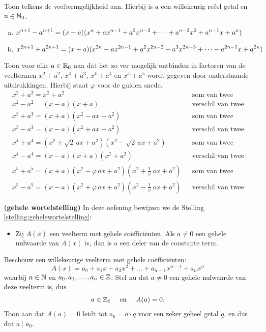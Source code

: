 \documentclass{ximera}
\begin{document}
\begin{Uitbreiding}
\begin{exercise} 
Toon telkens de veeltermgelijkheid aan. Hierbij is $a$ een willekeurig re\"eel getal en $n \in \mathbb{N}_0$.
\begin{enumerate}[(a)]
\item
$\displaystyle x^{n+1} - a^{n+1} = (x-a)(x^{n} + ax^{n-1} + a^2x^{n-2} + \dots + a^{n-2}x^2 + a^{n-1}x + a^{n})$
\item
$\displaystyle x^{2n+1} + a^{2n+1} = (x+a)(x^{2n} - ax^{2n-1} + a^2x^{2n-2} - a^3x^{2n-3} + \dots - a^{2n-1}x + a^{2n})$
\end{enumerate}
\end{exercise} 

\begin{exercise} 
\label{somtweevierdemachten}
Toon voor elke $a \in \mathbb{R}_0$ aan dat het zo ver mogelijk ontbinden in factoren van de veeltermen $x^2 \pm a^2$, $x^3 \pm a^3$, $x^4 \pm a^4$ en  $x^5 \pm a^5$ wordt gegeven door onderstaande uitdrukkingen. Hierbij staat $\varphi$ voor de gulden snede. %
\begin{align*}
& x^2 + a^2 = x^2 + a^2 && \text{som van twee kwadraten} \\
& x^2 - a^2 = (x-a)(x+a) && \text{verschil van twee kwadraten} \\
& x^3 + a^3 = (x+a)(x^2 - ax + a^2) && \text{som van twee derde machten} \\
& x^3 - a^3 = (x-a)(x^2 + ax + a^2) && \text{verschil van twee derde machten} \\
& x^4 + a^4 = (x^2 + \sqrt{2}\,ax + a^2)(x^2 - \sqrt{2}\,ax + a^2) && \text{som van twee vierde machten} \\
& x^4 - a^4 = (x-a)(x+a)(x^2+a^2) && \text{verschil van twee vierde machten} \\
& x^5 + a^5 = (x+a)(x^2-\varphi\,ax + a^2)(x^2+\frac{1}{\varphi}\,ax + a^2) && \text{som van twee vijfde machten} \\
& x^5 - a^5 = (x-a)(x^2+\varphi\,ax + a^2)(x^2-\frac{1}{\varphi}\,ax + a^2) && \text{verschil van twee vijfde machten}
\end{align*}
\end{exercise} 

\begin{exercise} 
{\bf (gehele wortelstelling)} 
In deze oefening bewijzen we de Stelling \ref{stelling:gehelewortelstelling}: 
\begin{itemize}
\item[]
Zij $A(x)$ een veelterm met gehele co\"effici\"enten. Als $a \neq 0$ een gehele nulwaarde van $A(x)$ is, dan is $a$ een deler van de constante term.
\end{itemize}
Beschouw een willekeurige veelterm met gehele co\"effici\"enten:
\[
A(x) = a_0 + a_1 x + a_2 x^2 + \dots + a_{n-1} x^{n-1} + a_nx^n
\]
waarbij $ n \in \mathbb{N}$ en $a_0, a_1, \ldots, a_n \in \mathbb{Z}$. Stel nu dat $a \neq 0$ een gehele nulwaarde van deze veelterm is, dus
\[
a \in \mathbb{Z}_0 \quad \text{ en } \quad A(a) = 0.
\]
Toon aan dat $A(a) = 0$ leidt tot $a_0 = a\cdot q$ voor een zeker geheel getal $q$, en dus dat $a \mid a_0$. 
\end{exercise} 
\end{Uitbreiding}
\end{document}

